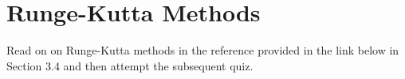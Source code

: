 \begin{myexercise}
\begin{mysolution}
\begin{enumerate}[label=(\alph*)]
%
%
%
\end{enumerate}
\end{mysolution}
\end{myexercise}

\section{Runge-Kutta Methods}
\activities
Read on on Runge-Kutta methods in the reference provided in the link below in Section 3.4 and then attempt the subsequent quiz.
\begin{activity}[\cg Reading]
\end{activity}

